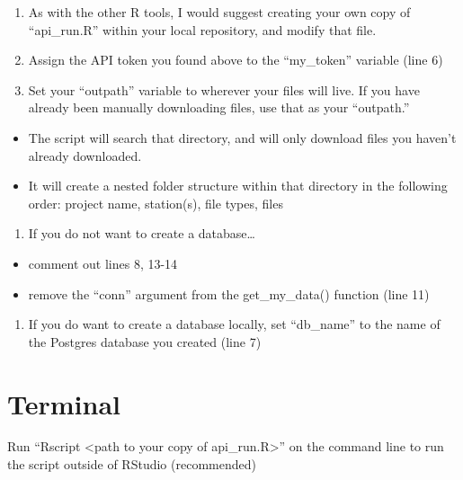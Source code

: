 \documentclass[
]{book}
\providecommand{\tightlist}{%
  \setlength{\itemsep}{0pt}\setlength{\parskip}{0pt}}
\begin{document}
\begin{enumerate}
\def\labelenumi{\arabic{enumi}.}
\tightlist
\item
  As with the other R tools, I would suggest creating your own copy of ``api\_run.R'' within your local repository, and modify that file.
\item
  Assign the API token you found above to the ``my\_token'' variable (line 6)\\
\item
  Set your ``outpath'' variable to wherever your files will live. If you have already been manually downloading files, use that as your ``outpath.''
\end{enumerate}

\begin{itemize}
\tightlist
\item
  The script will search that directory, and will only download files you haven't already downloaded.
\item
  It will create a nested folder structure within that directory in the following order: project name, station(s), file types, files
\end{itemize}

\begin{enumerate}
\def\labelenumi{\arabic{enumi}.}
\setcounter{enumi}{3}
\tightlist
\item
  If you do not want to create a database\ldots{}
\end{enumerate}

\begin{itemize}
\tightlist
\item
  comment out lines 8, 13-14
\item
  remove the ``conn'' argument from the get\_my\_data() function (line 11)
\end{itemize}

\begin{enumerate}
\def\labelenumi{\arabic{enumi}.}
\setcounter{enumi}{4}
\tightlist
\item
  If you do want to create a database locally, set ``db\_name'' to the name of the Postgres database you created (line 7)
\end{enumerate}

\hypertarget{terminal}{%
\section{Terminal}\label{terminal}}

Run ``Rscript \textless path to your copy of api\_run.R\textgreater{}'' on the command line to run the script outside of RStudio (recommended)
\end{document}
